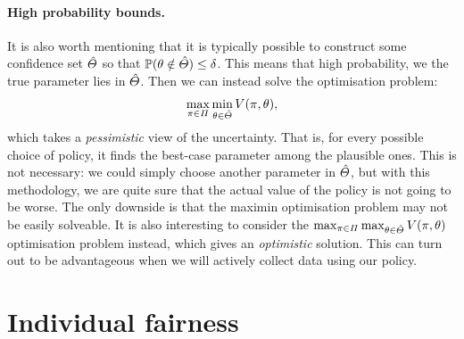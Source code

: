 {\paragraph{High probability bounds.} It is also worth mentioning that it is typically possible to construct some confidence set $\hat{\Theta}$ so that $\mathop{\mbox{\ensuremath{\mathbb{P}}}}\nolimits(\theta \notin \hat{\Theta}) \leq \delta$. This means that high probability, we the true parameter lies in $\hat{\Theta}$. Then we can instead solve the optimisation problem:
\[
  \max_{\pi \in \Pi} \min_{\theta \in \hat{\Theta}} V(\pi, \theta),
\]
which takes a \emph{pessimistic} view of the uncertainty. That is, for every possible choice of policy, it finds the best-case parameter among the plausible ones. This is not necessary: we could simply choose another parameter in $\hat{\Theta}$, but with this methodology, we are quite sure that the actual value of the policy is not going to be worse. The only downside is that the maximin optimisation problem may not be easily solveable. It is also interesting to consider the $\max_{\pi \in \Pi} \max_{\theta \in \hat{\Theta}} V(\pi, \theta)$ optimisation problem instead, which gives an \emph{optimistic} solution. This can turn out to be advantageous when we will actively collect data using our policy.
}

\section{Individual fairness}

